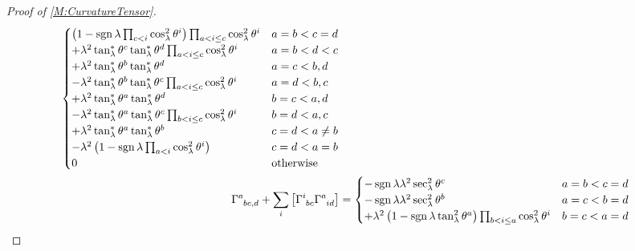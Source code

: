 \documentclass[../methodology.tex]{subfiles}
\begin{document}
\begin{proof}[Proof of \cref{M:CurvatureTensor}]
\begin{align*}
\begin{cases}
          \left(
          1-\sign{\lambda}\prod_{c<i}\cos_\lambda^2\tensor{\theta}{^i}
          \right)
          \prod_{a<i\le c}\cos_\lambda^2\tensor{\theta}{^i}
            & \text{\(a=b<c=d\)}    \\
          +\lambda^2\tan_\lambda^\ast\tensor{\theta}{^c}\tan_\lambda^\ast\tensor{\theta}{^d}\prod_{a<i\le c}\cos_\lambda^2\tensor{\theta}{^i}
            & \text{\(a=b<d<c\)}    \\
          +\lambda^2\tan_\lambda^\ast\tensor{\theta}{^b}\tan_\lambda^\ast\tensor{\theta}{^d}
            & \text{\(a=c<b,d\)}    \\
          -\lambda^2\tan_\lambda^\ast\tensor{\theta}{^b}\tan_\lambda^\ast\tensor{\theta}{^c}\prod_{a<i\le c}\cos_\lambda^2\tensor{\theta}{^i}
            & \text{\(a=d<b,c\)}    \\
          +\lambda^2\tan_\lambda^\ast\tensor{\theta}{^a}\tan_\lambda^\ast\tensor{\theta}{^d}
            & \text{\(b=c<a,d\)}    \\
          -\lambda^2\tan_\lambda^\ast\tensor{\theta}{^a}\tan_\lambda^\ast\tensor{\theta}{^c}\prod_{b<i\le c}\cos_\lambda^2\tensor{\theta}{^i}
            & \text{\(b=d<a,c\)}    \\
          +\lambda^2\tan_\lambda^\ast\tensor{\theta}{^a}\tan_\lambda^\ast\tensor{\theta}{^b}
            & \text{\(c=d<a\ne b\)} \\
          -\lambda^2
          \left(
          1-\sign{\lambda}\prod_{a<i}\cos_\lambda^2\tensor{\theta}{^i}
          \right)
            & \text{\(c=d<a=b\)}    \\
          0 & \text{otherwise}      \\
        \end{cases}                                                  \\
    \tensor{\Gamma}{^a_b_c_{,d}}
    +\sum_{i}\left[\tensor{\Gamma}{^i_b_c}\tensor{\Gamma}{^a_i_d}\right]
     & =\begin{cases}
          -\sign{\lambda}\lambda^2\sec_\lambda^2\tensor{\theta}{^c}                                                                              & \text{\(a=b<c=d\)} \\
          -\sign{\lambda}\lambda^2\sec_\lambda^2\tensor{\theta}{^b}                                                                              & \text{\(a=c<b=d\)} \\
          +\lambda^2\left(1-\sign{\lambda}\tan_\lambda^2\tensor{\theta}{^a}\right)\prod_{b<i\le a}{\cos_\lambda^2\tensor{\theta}{^i}}            & \text{\(b=c<a=d\)} \\

\end{cases}
\end{align*}
\end{proof}
\end{document}
